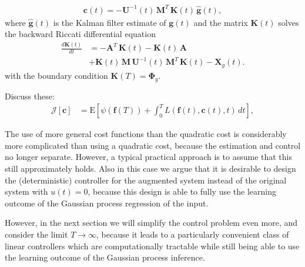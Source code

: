 \documentclass[journal]{IEEEtran}
\newcommand{\simo}[1]{{\color{red}#1}}
\begin{document}
%
\begin{equation}
\begin{split}
  \mathbf{c}(t) = -\mathbf{U}^{-1}(t) \, \mathbf{M}^T \, \mathbf{K}(t) \, \hat{\mathbf{g}}(t),
\end{split}
\end{equation}
%
where $\hat{\mathbf{g}}(t)$ is the Kalman filter estimate of $\mathbf{g}(t)$ and the matrix $\mathbf{K}(t)$ solves the backward Riccati differential equation
%
\begin{equation}
\begin{split}
  \frac{d\mathbf{K}(t)}{dt} &=
    -\mathbf{A}^T \, \mathbf{K}(t) - \mathbf{K}(t) \, \mathbf{A} \\
  &+  \mathbf{K}(t) \, \mathbf{M} \, \mathbf{U}^{-1}(t) \,
   \mathbf{M}^T \, \mathbf{K}(t) - \mathbf{X}_g(t).
\end{split}
\end{equation}
%
with the boundary condition $\mathbf{K}(T) =  \boldsymbol{\Phi}_g$.

\simo{Discuss these:}
%
\begin{equation}
\begin{split}
  \mathcal{J}[\mathbf{c}] &= \mathrm{E} \left[ \psi(\mathbf{f}(T))
   + \int_0^T L(\mathbf{f}(t),\mathbf{c}(t),t) \, dt \right],
\end{split}
\label{eq:quadcost1}
\end{equation}


The use of more general cost functions than the quadratic cost is considerably more complicated than using a quadratic cost, because the estimation and control no longer separate. However, a typical practical approach is to assume that this still approximately holds. Also in this case we argue that it is desirable to design the (deterministic) controller for the augmented system instead of the original system with $u(t) = 0$, because this design is able to fully use the learning outcome of the Gaussian process regression of the input.

However, in the next section we will simplify the control problem even more, and consider the limit $T \to \infty$, because it leads to a particularly convenient class of linear controllers which are computationally tractable while still being able to use the learning outcome of the Gaussian process inference.
\end{document}
